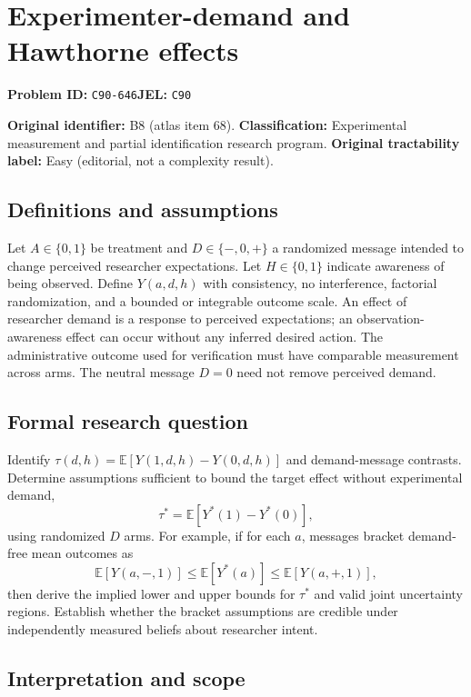 \documentclass[11pt,a4paper]{article}
\begin{document}
\section*{Experimenter-demand and Hawthorne effects}
\textbf{Problem ID:} \texttt{C90-646}\quad \textbf{JEL:} \texttt{C90}\par
\label{problem:OP-0068}
\label{atlas:prob:B8}

\noindent\textbf{Original identifier:} B8 (atlas item 68). \textbf{Classification:} Experimental measurement and partial identification research program. \textbf{Original tractability label:} Easy (editorial, not a complexity result).

\subsection*{Definitions and assumptions}

Let $A\in\{0,1\}$ be treatment and $D\in\{-,0,+\}$ a randomized message intended to change perceived researcher expectations. Let $H\in\{0,1\}$ indicate awareness of being observed. Define $Y(a,d,h)$ with consistency, no interference, factorial randomization, and a bounded or integrable outcome scale. An effect of researcher demand is a response to perceived expectations; an observation-awareness effect can occur without any inferred desired action. The administrative outcome used for verification must have comparable measurement across arms. The neutral message $D=0$ need not remove perceived demand.

\subsection*{Formal research question}

Identify $\tau(d,h)=\mathbb E[Y(1,d,h)-Y(0,d,h)]$ and demand-message contrasts. Determine assumptions sufficient to bound the target effect without experimental demand,
\[
\tau^*=\mathbb E[Y^*(1)-Y^*(0)],
\]
using randomized $D$ arms. For example, if for each $a$, messages bracket demand-free mean outcomes as
\[
\mathbb E[Y(a,-,1)]\leq\mathbb E[Y^*(a)]\leq\mathbb E[Y(a,+,1)],
\]
then derive the implied lower and upper bounds for $\tau^*$ and valid joint uncertainty regions. Establish whether the bracket assumptions are credible under independently measured beliefs about researcher intent.

\subsection*{Interpretation and scope}
\end{document}
